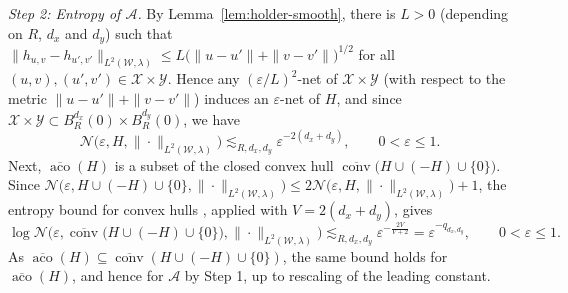 \documentclass[11pt]{amsart}
\theoremstyle{definition}
\theoremstyle{remark}
\newcommand{\1}{\mathbf{1}}
\numberwithin{equation}{section}
\begin{document}
\emph{Step 2: Entropy of $\mathcal{A}$.}
By Lemma~\ref{lem:holder-smooth}, there is $L>0$ (depending on $R$, $d_x$
and $d_y$) such that
$\|h_{u,v}-h_{u',v'}\|_{L^2(\mathcal W,\lambda)}
\le L\bigl(\|u-u'\|+\|v-v'\|\bigr)^{1/2}$ for all
$(u,v),(u',v')\in\mathcal X\times\mathcal Y$. Hence any
$(\varepsilon/L)^2$-net of $\mathcal X\times\mathcal Y$ (with respect to
the metric $\|u-u'\|+\|v-v'\|$) induces an $\varepsilon$-net of $H$, and
since $\mathcal X\times\mathcal Y \subset B^{d_x}_R(0) \times B^{d_y}_R(0)$, we have
\[
\mathcal N\bigl(\varepsilon,H,\|\cdot\|_{L^2(\mathcal W,\lambda)}\bigr)
\lesssim_{R,d_x,d_y} \varepsilon^{-2(d_x+d_y)},
\qquad 0<\varepsilon\le1.
\]
Next, $\overline{\operatorname{aco}}(H)$ is a subset of the
closed convex hull
$\overline{\operatorname{conv}}\bigl(H\cup(-H)\cup\{0\}\bigr)$. Since
$\mathcal N\bigl(\varepsilon,H\cup(-H)\cup\{0\},\|\cdot\|_{L^2(\mathcal W,\lambda)}\bigr)\le2\mathcal N\bigl(\varepsilon,H,\|\cdot\|_{L^2(\mathcal W,\lambda)}\bigr)+1$, the entropy bound for convex hulls
\cite[Theorem~2.6.9]{VanDerVaartWellner1996}, applied with
$V=2(d_x+d_y)$, gives
\[
\log \mathcal N\bigl(\varepsilon,\overline{\operatorname{conv}}
\bigl(H\cup(-H)\cup\{0\}\bigr),\|\cdot\|_{L^2(\mathcal W,\lambda)}\bigr)
\lesssim_{R,d_x,d_y} \varepsilon^{-\frac{2V}{V+2}}
=\varepsilon^{-q_{d_x,d_y}},
\qquad 0<\varepsilon\le1.
\]
As $\overline{\operatorname{aco}}(H)\subseteq
\overline{\operatorname{conv}}(H\cup(-H)\cup\{0\})$, the same bound holds
for $\overline{\operatorname{aco}}(H)$, and hence for $\mathcal{A}$ by
Step 1, up to rescaling of the leading constant.
\end{document}
